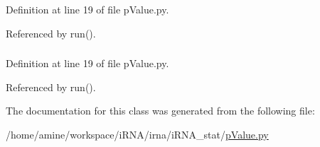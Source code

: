 \-Definition at line 19 of file p\-Value.\-py.



\-Referenced by run().

\hypertarget{classirna_1_1iRNA__stat_1_1pValue_1_1pValue_ab6dadf2bca6caeb00b1d6e66f13c7928}{
\subsubsection[{softname}]{}}
\label{classirna_1_1iRNA__stat_1_1pValue_1_1pValue_ab6dadf2bca6caeb00b1d6e66f13c7928}


\-Definition at line 19 of file p\-Value.\-py.



\-Referenced by run().



\-The documentation for this class was generated from the following file\-:\begin{DoxyCompactItemize}
\item 
/home/amine/workspace/i\-R\-N\-A/irna/i\-R\-N\-A\-\_\-stat/\hyperlink{iRNA__stat_2pValue_8py}{p\-Value.\-py}\end{DoxyCompactItemize}
